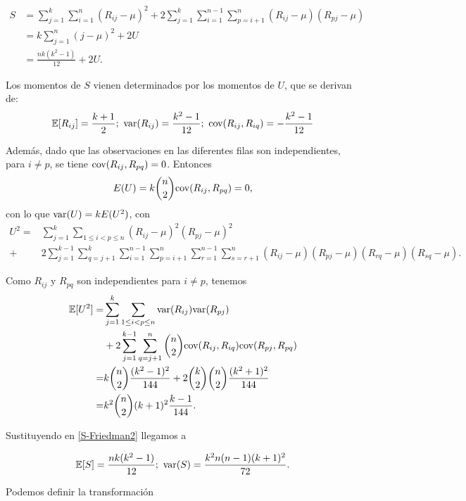 	\begin{align}
		S 	&= 	\sum\limits_{j=1}^k
					\sum\limits_{i=1}^n (R_{ij}-\mu)^2
				+ 2 \sum\limits_{j=1}^k
					\sum\limits_{i=1}^{n-1}
						\sum\limits_{p=i+1}^n
							(R_{ij}-\mu)(R_{pj}-\mu) 
				\nonumber \\
			&=	k \sum\limits_{j=1}^n (j-\mu)^2 + 2U 
				\nonumber \\
			&=  \frac{nk(k^2-1)}{12} + 2U	.
	\label{S-Friedman2}
	\end{align}
	
	Los momentos de $S$ vienen determinados por los momentos 
de $U$, que se derivan de:
	\[ 	\mathbb{E}[ R_{ij} ]= \frac{k+1}{2};\ 
		\var(R_{ij})=\frac{k^2-1}{12};\
		\cov(R_{ij},R_{iq}) = -\frac{k^2-1}{12}
	\]
	
	Además, dado que las observaciones en las diferentes 
filas son independientes, para $i \neq p$, se tiene
$\text{cov}(R_{ij},R_{pq})=0$. Entonces
	\[ E(U) = k {n \choose 2} \text{cov}(R_{ij},R_{pq})=0, \] 
	con lo que $\text{var}(U) = kE(U^2)$, con
	\begin{align*}
		U^2 =& \sum\limits_{j=1}^k
				\sum\limits_{1 \leq i < p \leq n}
					(R_{ij} - \mu)^2 (R_{pj} - \mu)^2 \\
			+& 2 
			    \sum\limits_{j=1}^{k-1}
			      \sum\limits_{q=j+1}^k
					\sum\limits_{i=1}^{n-1}
					  \sum\limits_{p=i+1}^n	
					  	\sum\limits_{r=1}^{n-1}
						  \sum\limits_{s=r+1}^n
				(R_{ij} - \mu)(R_{pj} - \mu)
				(R_{rq} - \mu)(R_{sq} - \mu).
	\end{align*}
	
	Como $R_{ij}$ y $R_{pq}$ son independientes para $i \neq p$, tenemos
	\begin{align*}
		\mathbb{E}[U^2] =& \sum\limits_{j=1}^k
					\sum\limits_{1 \leq i < p \leq n}
						\text{var}(R_{ij})\text{var}(R_{pj}) \\
			 &+ 2 
			    \sum\limits_{j=1}^{k-1}
			      \sum\limits_{q=j+1}^n
			    {n \choose 2}
				\text{cov}(R_{ij}, R_{iq}) \text{cov}(R_{pj}, R_{pq}) \\
			=& k {n \choose 2} \frac{(k^2-1)^2}{144} +
				2{k \choose 2}{n \choose 2} 
					\frac{(k^2+1)^2}{144} \\
			=& k^2 {n \choose 2} (k+1)^2 \frac{k-1}{144}.
	\end{align*}	
	
	Sustituyendo en \ref{S-Friedman2} llegamos a 
	
	\[ \mathbb{E}[S] = \frac{nk(k^2-1)}{12}; \ 
		\var(S)= \frac{k^2n(n-1)(k+1)^2}{72} .\]
	
	Podemos definir la transformación
	
